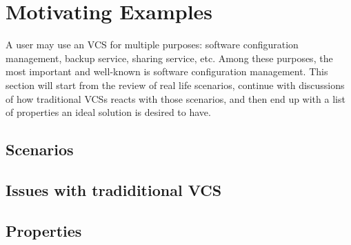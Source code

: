 \section{Motivating Examples}
\label{s:motivation}

A user may use an VCS for multiple purposes: software configuration management,
backup service, sharing service, etc.
Among these purposes, the most important and well-known is
software configuration management. This section will start from the review of
 real life scenarios, continue with discussions of how traditional
VCSs reacts with those scenarios, and then end up with a
list of properties an ideal solution is desired to have.

\subsection{Scenarios}


\subsection{Issues with tradiditional VCS}


\subsection{Properties}



